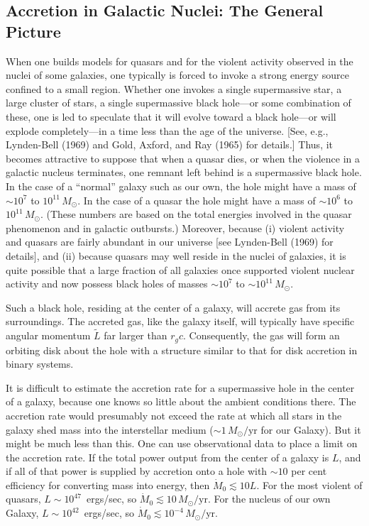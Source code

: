 \subsection{Accretion in Galactic Nuclei: The General Picture}
\label{sec:5.3}

When one builds models for quasars and for the violent activity observed in the
nuclei of some galaxies, one typically is forced to invoke a strong energy source
confined to a small region.  Whether one invokes a single supermassive star, a large
cluster of stars, a single supermassive black hole---or some combination
of these, one is led to speculate that it will evolve toward a black hole---or will
explode completely---in a time less than the age of the universe.  [See, e.g.,
Lynden-Bell (1969) and Gold, Axford, and Ray (1965) for details.]  Thus, it
becomes attractive to suppose that when a quasar dies, or when the violence
in a galactic nucleus terminates, one remnant left behind is a supermassive black
hole.  In the case of a ``normal'' galaxy such as our own, the hole might have a mass of
$\sim\!10^7$ to $10^{11}\,M_\odot$.  In
the case of a quasar the hole might have a mass of
$\sim\!10^6$ to $10^{11}\,M_\odot$.  (These numbers are based on the total energies involved in the
quasar phenomenon and in galactic outbursts.)  Moreover, because (i) violent
activity and quasars are fairly abundant in our universe [see Lynden-Bell (1969)
for details], and (ii) because quasars may well reside in the nuclei of galaxies, it
is quite possible that a large fraction of all galaxies once supported violent
nuclear activity and now possess black holes of masses $\sim\!10^7$ to $\sim\!10^{11}\,M_\odot$.

Such a black hole, residing at the center of a galaxy, will accrete gas
from its surroundings.  The accreted gas, like the galaxy itself, will typically have
specific angular momentum $\tilde{L}$ far larger than $r_g c$.  Consequently, the gas will form an orbiting disk
about the hole with a structure similar to that for disk accretion in binary
systems.

It is difficult to estimate the accretion rate for a supermassive hole in the
center of a galaxy, because one knows so little about the ambient conditions
there.  The accretion rate would presumably not exceed the rate at which all
stars in the galaxy shed mass into the interstellar medium ($\sim\!1\,M_\odot/\text{yr}$ for our
Galaxy).  But it might be much less than this.  One can use observational data to
place a limit on the accretion rate.  If the total power output from the center of a
galaxy is $L$, and if all of that power is supplied by accretion onto a hole with
$\sim\!10$ per cent efficiency for converting mass into energy, then $\dot{M}_0 \lesssim 10L$.  For
the most violent of quasars, $L \sim 10^{47}$~ergs/sec, so $\dot{M}_0 \lesssim 10\,M_\odot/\text{yr}$.  For the
nucleus of our own Galaxy, $L \sim 10^{42}$~ergs/sec, so $\dot{M}_0 \lesssim 10^{-4}\,M_\odot/\text{yr}$.

